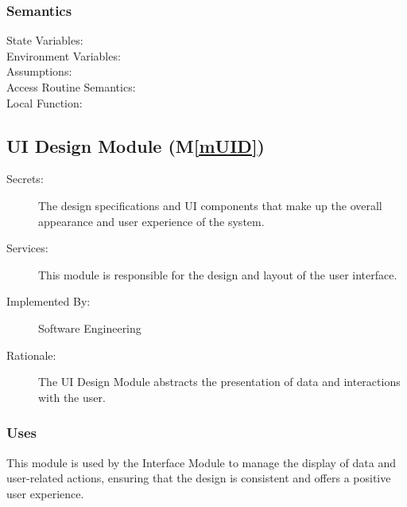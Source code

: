 \documentclass[12pt, titlepage]{article}
\newcommand{\mref}[1]{M\ref{#1}}
\begin{document}
\begin{description}
\begin{description}
\subsubsection{Semantics}
\begin{description}
  \item[State Variables:]
  \item[Environment Variables:]  
  \item[Assumptions:] 
  \item[Access Routine Semantics:] 
  \item[Local Function:] 
\end{description}

\subsection{UI Design Module (\mref{mUID})}
\begin{description}
  \item[Secrets:] The design specifications and UI components that make  up the
  overall appearance and user experience of the system.
  \item[Services:] This module is responsible for the design and layout of the
  user interface.
  \item[Implemented By:] Software Engineering
  \item[Rationale:] The UI Design Module abstracts the presentation of data and
  interactions with the user.
\end{description}

\subsubsection{Uses}
This module is used by the Interface Module to manage the display of data and
user-related actions, ensuring that the design is consistent and offers a
positive user experience.


\end{description}
\end{description}
\end{document}
